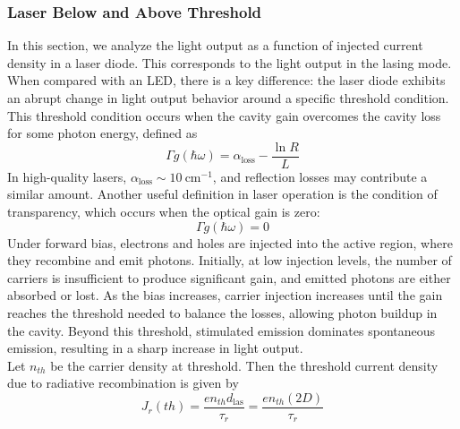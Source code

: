 \subsubsection{Laser Below and Above Threshold}
In this section, we analyze the light output as a function of injected current density in a laser diode. This corresponds to the light output in the lasing mode. When compared with an LED, there is a key difference: the laser diode exhibits an abrupt change in light output behavior around a specific threshold condition. This threshold condition occurs when the cavity gain overcomes the cavity loss for some photon energy, defined as
\begin{equation}
	\Gamma g(\hbar\omega) = \alpha_{\text{loss}} - \frac{\ln R}{L}
\end{equation}
In high-quality lasers, \( \alpha_{\text{loss}} \sim 10~\text{cm}^{-1} \), and reflection losses may contribute a similar amount. Another useful definition in laser operation is the condition of transparency, which occurs when the optical gain is zero:
\begin{equation}
	\Gamma g(\hbar\omega) = 0
\end{equation}
Under forward bias, electrons and holes are injected into the active region, where they recombine and emit photons. Initially, at low injection levels, the number of carriers is insufficient to produce significant gain, and emitted photons are either absorbed or lost. As the bias increases, carrier injection increases until the gain reaches the threshold needed to balance the losses, allowing photon buildup in the cavity. Beyond this threshold, stimulated emission dominates spontaneous emission, resulting in a sharp increase in light output.\\
Let \( n_{th} \) be the carrier density at threshold. Then the threshold current density due to radiative recombination is given by
\begin{equation}
	J_r(th) = \frac{e n_{th} d_{\text{las}}}{\tau_r} = \frac{e n_{th}(2D)}{\tau_r}
\end{equation}
